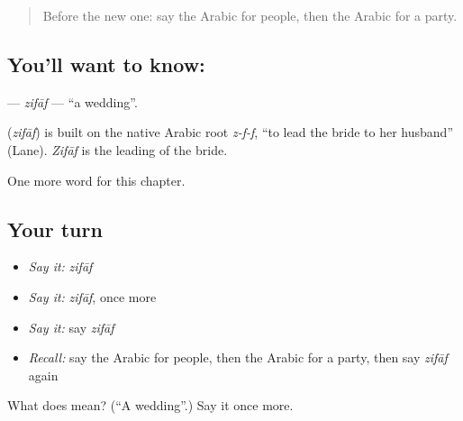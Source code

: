 \label{lesson:AR-C275-zifaf}



\begin{quote}
Before the new one: say the Arabic for people, then the Arabic for a party.
\end{quote}

\subsection*{You'll want to know: }
\textbf{} — \emph{zifāf} — \textquotedblleft{}a wedding\textquotedblright{}.

\begin{cousinweb}
\textbf{} (\emph{zifāf}) is built on the native Arabic root \emph{z-f-f}, \textquotedblleft{}to lead the bride to her husband\textquotedblright{} (Lane). \emph{Zifāf} is the leading of the bride.
\end{cousinweb}

\begin{grammarlens}[title={What you've built}]
One more word for this chapter.
\end{grammarlens}

\subsection*{Your turn}
\begin{itemize}
\raggedright
  \item \emph{Say it:} \emph{zifāf}
  \item \emph{Say it:} \emph{zifāf}, once more
  \item \emph{Say it:} say \emph{zifāf}
  \item \emph{Recall:} say the Arabic for people, then the Arabic for a party, then say \emph{zifāf} again
\end{itemize}

\begin{tcolorbox}[breakable,colback=teal!4,colframe=teal!35!black,title={Before you move on}]
What does  mean? (\textquotedblleft{}A wedding\textquotedblright{}.) Say it once more.
\end{tcolorbox}
